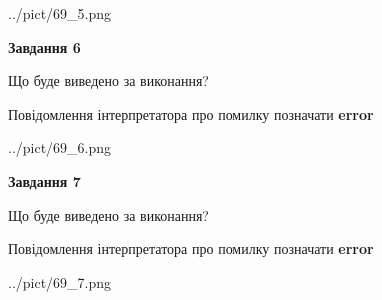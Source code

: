 \documentclass[10pt, ukrainian]{article}
\begin{document}
{\begin {large}
\begin{center}
	{../pict/69_5.png}
\end{center}
\newpage

{\begin {center}\textbf{Завдання 6}\end {center}}\par
Що буде виведено за виконання? \par
Повідомлення інтерпретатора про помилку позначати \textbf{error}

\begin{center}
	{../pict/69_6.png}
\end{center}
\newpage

{\begin {center}\textbf{Завдання 7}\end {center}}\par
Що буде виведено за виконання? \par
Повідомлення інтерпретатора про помилку позначати \textbf{error}

\begin{center}
	{../pict/69_7.png}
\end{center}
\newpage

\end {large}}
\end{document}
